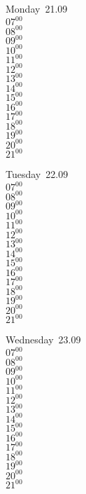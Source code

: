 \documentclass[11pt,a4paper]{book}\usepackage[]{graphicx}\usepackage[]{color}
\begin{document}
\begin{headerbox}
\end{headerbox}
\begin{weekdaybox}
  Monday~21.09\\
  { 
  \vfill
  $07^{00}$\\
$08^{00}$\\
$09^{00}$\\
$10^{00}$\\
$11^{00}$\\
$12^{00}$\\
$13^{00}$\\
$14^{00}$\\
$15^{00}$\\
$16^{00}$\\
$17^{00}$\\
$18^{00}$\\
$19^{00}$\\
$20^{00}$\\
$21^{00}$\\
  }
\end{weekdaybox}
\begin{weekdaybox}
  Tuesday~22.09\\
  { 
  \vfill
  $07^{00}$\\
$08^{00}$\\
$09^{00}$\\
$10^{00}$\\
$11^{00}$\\
$12^{00}$\\
$13^{00}$\\
$14^{00}$\\
$15^{00}$\\
$16^{00}$\\
$17^{00}$\\
$18^{00}$\\
$19^{00}$\\
$20^{00}$\\
$21^{00}$\\
  }
\end{weekdaybox}
\begin{weekdaybox}
  Wednesday~23.09\\
  { 
  \vfill
  $07^{00}$\\
$08^{00}$\\
$09^{00}$\\
$10^{00}$\\
$11^{00}$\\
$12^{00}$\\
$13^{00}$\\
$14^{00}$\\
$15^{00}$\\
$16^{00}$\\
$17^{00}$\\
$18^{00}$\\
$19^{00}$\\
$20^{00}$\\
$21^{00}$\\
  }
\end{weekdaybox}
\end{document}
